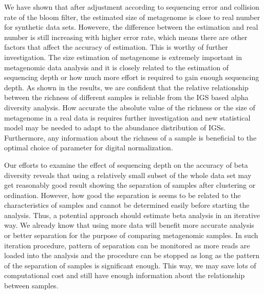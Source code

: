 We have shown that after adjustment according to sequencing error and collision
rate of the bloom filter, the estimated size of metagenome is close to real
number for synthetic data sets. Howevere, the difference between the estimation and
real number is still increasing with higher error rate, which means there are
other factors that affect the accuracy of estimation. This is worthy of further
investigation. The size estimation of metagenome is extremely important in
metagenomic data analysis and it is closely related to the estimation of
sequencing depth or how much more effort is required to gain enough sequencing
depth. As shown in the results, we are confident that the relative relationship 
between the richness of different samples is reliable from the IGS based alpha
diversity analysis. How accurate the absolute value of the richness or the size
of metagenome in a real data is requires further investigation and new  
statistical model may be needed to adapt to the abundance distribution of IGSs.    
Furthermore, any information about the richness of a sample is beneficial to
the optimal choice of parameter for digital normalization.

Our efforts to examine the effect of sequencing depth on the accuracy of beta
diversity reveals that using a relatively small subset of the whole data set may
get reasonably good result showing the separation of samples after clustering
or ordination. However, how good the separation is seems to be related to the
characteristics of samples and cannot be determined easily before starting the
analysis. Thus, a potential approach should estimate beta analysis in an iterative
way. We already know that using more data will benefit more accurate analysis or better
separation for the purpose of comparing metagenomic samples. In such
iteration procedure, pattern of separation can be monitored as more reads
are loaded into the analysis and the procedure can be stopped as long as the
pattern of the separation of samples is significant enough. This way, we may
save lots of computational cost and still have enough information about the
relationship between samples. 
 
    
    
    
    
    
    

